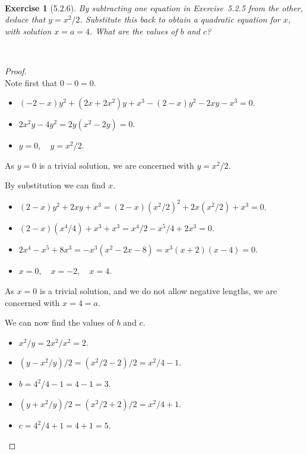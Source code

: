 \documentclass[12pt]{article}
\newcommand{\XB}{\color{black}}
\newcommand{\XBB}{\color{blue}}
\newcommand{\ds}{\displaystyle}
\theoremstyle{plain}
\newtheorem{ex}{Exercise}
\begin{document}
\newpage

\XBB\hrulefill\XB \\
\begin{ex} [5.2.6]
  By subtracting one equation in Exercise~5.2.5 from the other, deduce that $y=x^2/2$. Substitute this back to obtain a quadratic equation for $x$, with solution $x=a=4$. What are the values of $b$ and $c$?
\end{ex}
\XBB\hrulefill\XB \\

\begin{proof}
  \ \\

  Note first that $ 0 - 0 = 0 $. 

  \begin{itemize}
    \item $ \ds (-2 - x)y^{2} + (2x + 2x^{2})y + x^{3} - (2 - x)y^{2} - 2xy - x^{3} = 0 $. 
    \item $ \ds 2x^{2}y - 4y^{2} = 2y(x^{2} - 2y) = 0 $. 
    \item $ \ds y = 0, \quad y = x^{2} / 2$.
  \end{itemize}

  As $ y = 0 $ is a trivial solution, we are concerned with $ y = x^{2}/2 $. 

  By substitution we can find $ x $. 

  \begin{itemize}
    \item $ \ds (2 - x)y^{2} + 2xy + x^{3} = (2 - x)(x^{2}/2)^{2} + 2x(x^{2}/2) + x^{3} = 0 $.
    \item $ \ds (2 - x)(x^{4}/4) + x^{3} + x^{3} = x^{4}/2 - x^{5}/4 + 2x^{3} = 0 $.
    \item $ \ds 2x^{4} - x^{5} + 8x^{3} = -x^{3}(x^{2} -2x - 8) = x^{3}(x + 2)(x - 4) = 0 $.
    \item $ \ds x = 0, \quad x = -2, \quad x = 4 $.
  \end{itemize}

  As $ x = 0 $ is a trivial solution, and we do not allow negative lengths, we are concerned with $ x = 4 = a $. 

  We can now find the values of $ b $ and $ c $.

  \begin{itemize}
    \item $ \ds x^{2}/y = 2x^{2}/x^{2} = 2 $.
    \item $ \ds (y - x^{2} / y) / 2 = (x^{2}/2 - 2) / 2 = x^{2}/4 - 1 $.
    \item $ \ds b = 4^{2}/4 - 1 = 4 - 1 = 3 $.
    \item $ \ds (y + x^{2} / y) / 2 = (x^{2}/2 + 2) / 2 = x^{2}/4 + 1 $.
    \item $ \ds c = 4^{2}/4 + 1 = 4 + 1 = 5 $.
  \end{itemize}


\end{proof}
\end{document}
